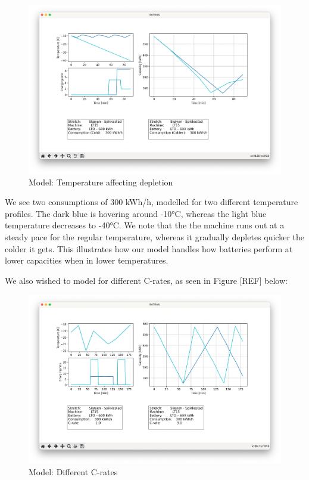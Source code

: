 \documentclass{article}
\begin{document}
\begin{figure}[H]
    \centering
    \includegraphics*[width=1\textwidth]{img/image12.png}
    \caption{Model: Temperature affecting depletion}
\end{figure}

We see two consumptions of 300 kWh/h, modelled for two different temperature profiles. The dark blue is hovering around -10°C, whereas the light blue temperature decreases to -40°C. We note that the the machine runs out at a steady pace for the regular temperature, whereas it gradually depletes quicker the colder it gets. This illustrates how our model handles how batteries perform at lower capacities when in lower temperatures.

We also wished to model for different C-rates, as seen in Figure [REF] below:


\begin{figure}[H]
    \centering
    \includegraphics*[width=1\textwidth]{img/image9.png}
    \caption{Model: Different C-rates}
\end{figure}
\end{document}

